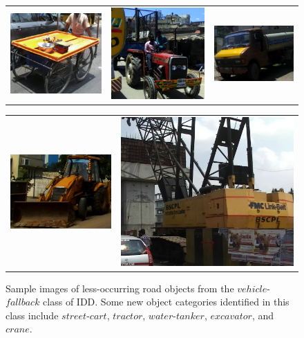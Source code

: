\documentclass[letterpaper]{article} %
\begin{document}
\begin{figure}[t]
\centering
\begin{tabular}{ccc}
\includegraphics[height=0.21\linewidth,width=0.30\linewidth]{street_cart_10.jpg}
&
\includegraphics[height=0.21\linewidth,width=0.30\linewidth]{tractor_10.jpg}
&
\includegraphics[height=0.21\linewidth,width=0.30\linewidth]{water_tanker_13.jpg}\\
\end{tabular} 
\begin{tabular}{cc}
\includegraphics[height=0.21\linewidth,width=0.30\linewidth]{JCB_23.jpg}
&
\includegraphics[height=0.21\linewidth,width=0.30\linewidth]{crane_00.jpg}
\end{tabular}
\caption{Sample images of less-occurring road objects from the $vehicle$-$fallback$ class of IDD. Some new object categories identified in this class include $street$-$cart$, $tractor$, $water$-$tanker$, $excavator$, and $crane$.}
\label{fig_vfb}
\end{figure}
\end{document}
